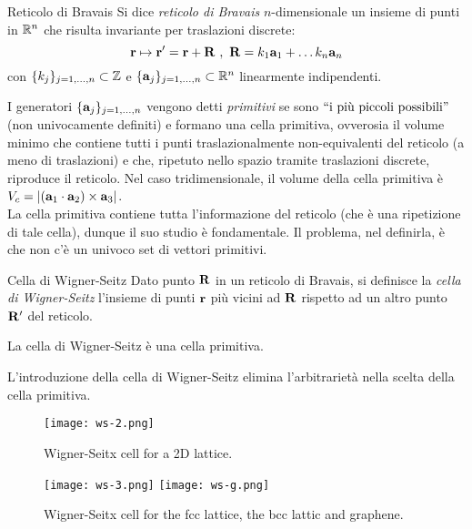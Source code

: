\begin{definition}{Reticolo di Bravais}{}
	Si dice \textit{reticolo di Bravais} $ n $-dimensionale un insieme di punti in $ \mathbb{R}^n $ che risulta invariante per traslazioni discrete:
	\begin{equation}
		\mathbf{r} \mapsto \mathbf{r}' = \mathbf{r} + \mathbf{R}
		\ , \
		\mathbf{R} = k_1 \mathbf{a}_1 + \dots k_n \mathbf{a}_n
	\end{equation}
	con $ \{k_j\}_{j = 1,\dots,n} \subset \mathbb{Z} $ e $ \{\mathbf{a}_j\}_{j = 1,\dots,n} \subset \mathbb{R}^n $ linearmente indipendenti.
\end{definition}

I generatori $ \{\mathbf{a}_j\}_{j = 1,\dots,n} $ vengono detti \textit{primitivi} se sono $ ``\text{i più piccoli possibili}" $ (non univocamente definiti) e formano una cella primitiva, ovverosia il volume minimo che contiene tutti i punti traslazionalmente non-equivalenti del reticolo (a meno di traslazioni) e che, ripetuto nello spazio tramite traslazioni discrete, riproduce il reticolo. Nel caso tridimensionale, il volume della cella primitiva è $ V_c = \left\lvert(\mathbf{a}_1 \cdot \mathbf{a}_2) \times \mathbf{a}_3\right\rvert $. \\
La cella primitiva contiene tutta l'informazione del reticolo (che è una ripetizione di tale cella), dunque il suo studio è fondamentale. Il problema, nel definirla, è che non c'è un univoco set di vettori primitivi.

\begin{definition}{Cella di Wigner-Seitz}{}
	Dato punto $ \mathbf{R} $ in un reticolo di Bravais, si definisce la \textit{cella di Wigner-Seitz} l'insieme di punti $ \mathbf{r} $ più vicini ad $ \mathbf{R} $ rispetto ad un altro punto $ \mathbf{R}' $ del reticolo.
\end{definition}

\begin{proposition}{}
	La cella di Wigner-Seitz è una cella primitiva.
\end{proposition}

L'introduzione della cella di Wigner-Seitz elimina l'arbitrarietà nella scelta della cella primitiva.

\begin{figure}
	\centering
	\texttt{[image: ws-2.png]}
	\caption{Wigner-Seitx cell for a 2D lattice.}
	\label{ws-2}
\end{figure}
\begin{figure}
	\centering
	\texttt{[image: ws-3.png]}
	\quad
	\texttt{[image: ws-g.png]}
	\caption{Wigner-Seitx cell for the fcc lattice, the bcc lattic and graphene.}
	\label{ws-3}
\end{figure}

